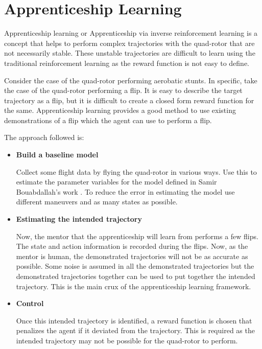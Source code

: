 \documentclass[hidelinks,BTech]{iitmdiss}
\begin{document}

\chapter{Apprenticeship Learning}

Apprenticeship learning or Apprenticeship via inverse reinforcement learning \cite{ApprenticeshipLearning} is a concept that helps to perform complex trajectories with the quad-rotor that are not necessarily stable. These unstable trajectories are difficult to learn using the traditional reinforcement learning as the reward function is not easy to define.

Consider the case of the quad-rotor performing aerobatic stunts. In specific, take the case of the quad-rotor performing a flip. It is easy to describe the target trajectory as a flip, but it is difficult to create a closed form reward function for the same. Apprenticeship learning provides a good method to use existing demonstrations of a flip which the agent can use to perform a flip.

The approach followed is:

\begin{itemize}
\item{{\bf Build a baseline model}

Collect some flight data by flying the quad-rotor in various ways. Use this to estimate the parameter variables for the model defined in Samir Bouabdallah's work \cite{QuadrotorDynamics}. To reduce the error in estimating the model use different maneuvers and as many states as possible.}

\item{{\bf Estimating the intended trajectory}

Now, the mentor that the apprenticeship will learn from performs a few flips. The state and action information is recorded during the flips. Now, as the mentor is human, the demonstrated trajectories will not be as accurate as possible. Some noise is assumed in all the demonstrated trajectories but the demonstrated trajectories together can be used to put together the intended trajectory. This is the main crux of the apprenticeship learning framework.}

\item{{\bf Control}

Once this intended trajectory is identified, a reward function is chosen that penalizes the agent if it deviated from the trajectory. This is required as the intended trajectory may not be possible for the quad-rotor to perform.}

\end{itemize}
\end{document}
